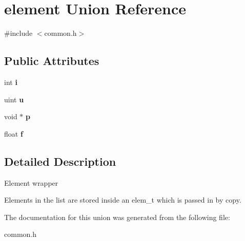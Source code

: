 \hypertarget{unionelement}{}\section{element Union Reference}
\label{unionelement}


{\ttfamily \#include $<$common.\+h$>$}

\subsection*{Public Attributes}
\begin{DoxyCompactItemize}
\item 
int {\bfseries i}\hypertarget{unionelement_a4e41a1440036146f7a3c50c07a91e7fe}{}\label{unionelement_a4e41a1440036146f7a3c50c07a91e7fe}

\item 
uint {\bfseries u}\hypertarget{unionelement_abd4034f37eb6d6ecdda71c9102680902}{}\label{unionelement_abd4034f37eb6d6ecdda71c9102680902}

\item 
void $\ast$ {\bfseries p}\hypertarget{unionelement_a075c65aee9ffc316eb213e9d0606e0b9}{}\label{unionelement_a075c65aee9ffc316eb213e9d0606e0b9}

\item 
float {\bfseries f}\hypertarget{unionelement_a8cf2d86c582a0e86d5f1ee1e4f62816b}{}\label{unionelement_a8cf2d86c582a0e86d5f1ee1e4f62816b}

\end{DoxyCompactItemize}


\subsection{Detailed Description}
Element wrapper

Elements in the list are stored inside an elem\+\_\+t which is passed in by copy. 

The documentation for this union was generated from the following file\+:\begin{DoxyCompactItemize}
\item 
common.\+h\end{DoxyCompactItemize}
